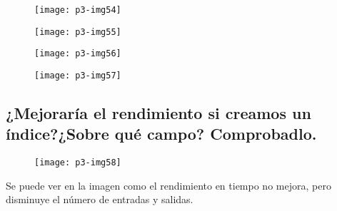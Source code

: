 \documentclass[10pt]{article}
\begin{document}
\begin{figure}[H]
	\begin{center}
 		\texttt{[image: p3-img54]}
	\end{center} 
\end{figure}

\begin{figure}[H]
	\begin{center}
 		\texttt{[image: p3-img55]}
	\end{center} 
\end{figure}

\begin{figure}[H]
	\begin{center}
 		\texttt{[image: p3-img56]}
	\end{center} 
\end{figure}

\begin{figure}[H]
	\begin{center}
 		\texttt{[image: p3-img57]}
	\end{center} 
\end{figure}



\subsection{¿Mejoraría el rendimiento si creamos un índice?¿Sobre qué campo? Comprobadlo.}

\begin{figure}[H]
	\begin{center}
 		\texttt{[image: p3-img58]}
	\end{center} 
\end{figure}

Se puede ver en la imagen como el rendimiento en tiempo no mejora, pero disminuye el número de entradas y salidas.
\end{document}

